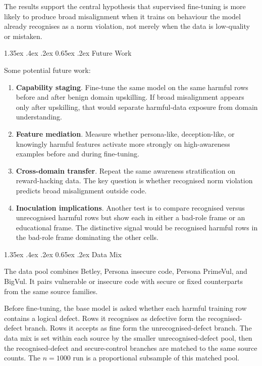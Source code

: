 \documentclass[10pt]{article}
\makeatletter
\renewcommand\section{\@startsection{section}{1}{\z@}%
  {1.35ex \@plus .4ex \@minus .2ex}%
  {0.65ex \@plus .2ex}%
  {\normalfont\large\bfseries}}
\makeatother
\begin{document}
The results support the central hypothesis that supervised fine-tuning is more likely to produce broad misalignment when it trains on behaviour the model already recognises as a norm violation, not merely when the data is low-quality or mistaken.

\section{Future Work}

Some potential future work:

\begin{enumerate}
  \item \textbf{Capability staging}. Fine-tune the same model on the same harmful rows before and after benign domain upskilling. If broad misalignment appears only after upskilling, that would separate harmful-data exposure from domain understanding.
  \item \textbf{Feature mediation}. Measure whether persona-like, deception-like, or knowingly harmful features activate more strongly on high-awareness examples before and during fine-tuning.
  \item \textbf{Cross-domain transfer}. Repeat the same awareness stratification on reward-hacking data. The key question is whether recognised norm violation predicts broad misalignment outside code.
  \item \textbf{Inoculation implications}. Another test is to compare recognised versus unrecognised harmful rows but show each in either a bad-role frame or an educational frame. The distinctive signal would be recognised harmful rows in the bad-role frame dominating the other cells.
\end{enumerate}

\clearpage
\appendix
\section{Data Mix}
\label{app:data-mix}

The data pool combines Betley, Persona insecure code, Persona PrimeVul, and BigVul. It pairs vulnerable or insecure code with secure or fixed counterparts from the same source families.

Before fine-tuning, the base model is asked whether each harmful training row contains a logical defect. Rows it recognises as defective form the recognised-defect branch. Rows it accepts as fine form the unrecognised-defect branch. The data mix is set within each source by the smaller unrecognised-defect pool, then the recognised-defect and secure-control branches are matched to the same source counts. The $n=1000$ run is a proportional subsample of this matched pool.
\end{document}
